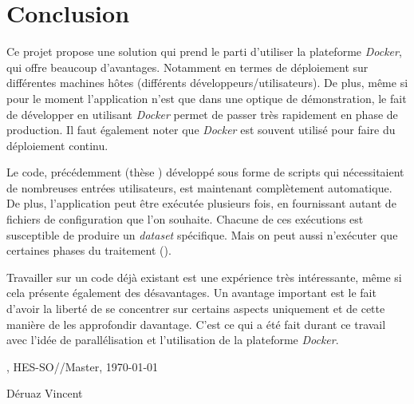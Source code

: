 \chapter{Conclusion}
\label{ch:conclusion}

Ce projet propose une solution qui prend le parti d'utiliser la plateforme \emph{Docker}, qui offre beaucoup d'avantages. Notamment en termes de déploiement sur différentes machines hôtes (différents développeurs/utilisateurs). De plus, même si pour le moment l'application n'est que dans une optique de démonstration, le fait de développer en utilisant \emph{Docker} permet de passer très rapidement en phase de production. Il faut également noter que \emph{Docker} est souvent utilisé pour faire du déploiement continu.

Le code, précédemment (thèse \thLeite) développé sous forme de scripts qui nécessitaient de nombreuses entrées utilisateurs, est maintenant complètement automatique. De plus, l'application peut être exécutée plusieurs fois, en fournissant autant de fichiers de configuration que l'on souhaite. Chacune de ces exécutions est susceptible de produire un \emph{dataset} spécifique. Mais on peut aussi n'exécuter que certaines phases du traitement (\thLeite).

Travailler sur un code déjà existant est une expérience très intéressante, même si cela présente également des désavantages. Un avantage important est le fait d'avoir la liberté de se concentrer sur certains aspects uniquement et de cette manière de les approfondir davantage. C'est ce qui a été fait durant ce travail avec l'idée de parallélisation et l'utilisation de la plateforme \emph{Docker}.




{\large \Place, HES-SO//Master, \today}

Déruaz Vincent
